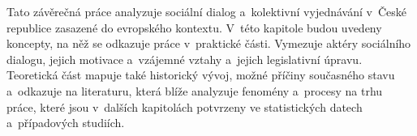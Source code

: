 Tato závěrečná práce analyzuje sociální dialog a~kolektivní vyjednávání v~České republice zasazené do evropského kontextu. V~této kapitole budou uvedeny koncepty, na něž se odkazuje práce v~praktické části. Vymezuje aktéry sociálního dialogu, jejich motivace a~vzájemné vztahy a~jejich legislativní úpravu. Teoretická část mapuje také historický vývoj, možné příčiny současného stavu a~odkazuje na literaturu, která blíže analyzuje fenomény a~procesy na trhu práce, které jsou v~dalších kapitolách potvrzeny ve statistických datech a~případových studiích.
\newpage